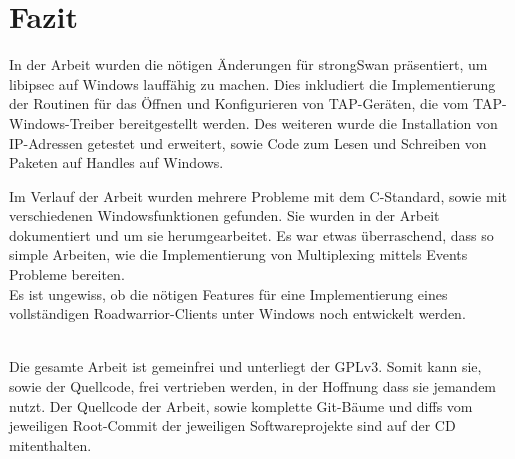 



\section{Fazit}

In der Arbeit wurden die nötigen Änderungen für strongSwan präsentiert, um
libipsec auf Windows lauffähig zu machen. Dies inkludiert die Implementierung
der Routinen für das Öffnen und Konfigurieren von TAP-Geräten, die vom TAP-Windows-Treiber
bereitgestellt werden. Des weiteren wurde die Installation von IP-Adressen getestet
und erweitert, sowie Code zum Lesen und Schreiben von Paketen auf Handles auf Windows.

Im Verlauf der Arbeit wurden mehrere Probleme mit dem C-Standard, sowie mit
verschiedenen Windowsfunktionen gefunden. Sie wurden in der Arbeit dokumentiert
und um sie herumgearbeitet. Es war etwas überraschend, dass so simple Arbeiten,
wie die Implementierung von Multiplexing mittels Events Probleme bereiten.
\\
Es ist ungewiss, ob die nötigen Features für eine Implementierung eines
vollständigen Roadwarrior-Clients unter Windows noch entwickelt werden.

\\
Die gesamte Arbeit ist gemeinfrei und unterliegt der GPLv3. Somit kann sie,
sowie der Quellcode, frei vertrieben werden, in der Hoffnung dass sie jemandem nutzt.
Der Quellcode der Arbeit, sowie komplette Git-Bäume und diffs vom jeweiligen Root-Commit
der jeweiligen Softwareprojekte sind auf der CD mitenthalten.
